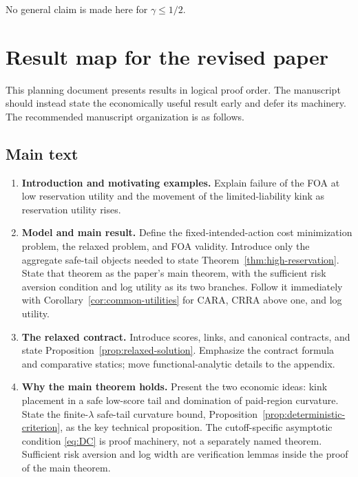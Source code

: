 \documentclass[11pt]{article}
\theoremstyle{remark}
\begin{document}
No general claim is made here for $\gamma\le1/2$.

\section{Result map for the revised paper}

This planning document presents results in logical proof order.  The manuscript
should instead state the economically useful result early and defer its machinery.
The recommended manuscript organization is as follows.

\subsection*{Main text}

\begin{enumerate}
 \item \textbf{Introduction and motivating examples.}  Explain failure of the
 FOA at low reservation utility and the movement of the limited-liability kink
 as reservation utility rises.

 \item \textbf{Model and main result.}  Define the fixed-intended-action cost
 minimization problem, the relaxed problem, and FOA validity.  Introduce only the
 aggregate safe-tail objects needed to state
 Theorem~\ref{thm:high-reservation}.  State that theorem as the paper's main
 theorem, with the sufficient risk aversion condition and log utility as its
two branches.  Follow it
 immediately with Corollary~\ref{cor:common-utilities} for CARA, CRRA above one,
 and log utility.

 \item \textbf{The relaxed contract.}  Introduce scores, links, and canonical
 contracts, and state Proposition~\ref{prop:relaxed-solution}.  Emphasize the
 contract formula and comparative statics; move functional-analytic details to
 the appendix.

 \item \textbf{Why the main theorem holds.}  Present the two economic ideas:
 kink placement in a safe low-score tail and domination of paid-region curvature.
 State the finite-$\lambda$ safe-tail curvature bound,
 Proposition~\ref{prop:deterministic-criterion}, as the key technical
 proposition.  The cutoff-specific asymptotic condition \eqref{eq:DC} is proof
 machinery, not a separately named theorem.  Sufficient risk aversion and log
 width are verification lemmas inside the proof of the main theorem.


\end{enumerate}
\end{document}
